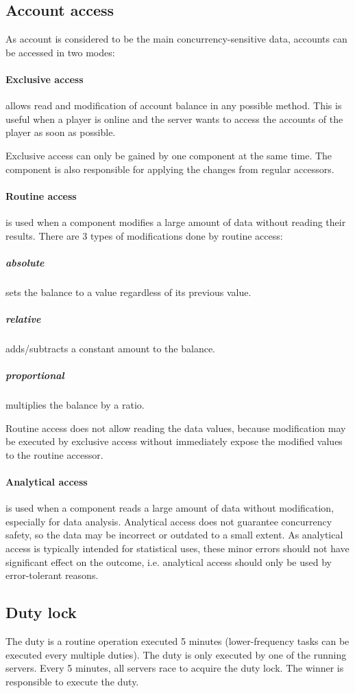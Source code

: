 \documentclass{report}
\begin{document}
				\subsection{Account access}
					As account is considered to be the main concurrency-sensitive data, accounts can be accessed in two modes:
					\paragraph{Exclusive access} allows read and modification of account balance in any possible method.
						This is useful when a player is online and the server wants to access the accounts of the player as soon as possible.

						Exclusive access can only be gained by one component at the same time.
						The component is also responsible for applying the changes from regular accessors.

					\paragraph{Routine access} is used when a component modifies a large amount of data without reading their results.
						There are 3 types of modifications done by routine access:
						\subparagraph{absolute} sets the balance to a value regardless of its previous value.
						\subparagraph{relative} adds/subtracts a constant amount to the balance.
						\subparagraph{proportional} multiplies the balance by a ratio.

						Routine access does not allow reading the data values, because modification may be executed by exclusive access
						without immediately expose the modified values to the routine accessor.

					\paragraph{Analytical access} is used when a component reads a large amount of data without modification, especially for data analysis.
					Analytical access does not guarantee concurrency safety, so the data may be incorrect or outdated to a small extent.
					As analytical access is typically intended for statistical uses, these minor errors should not have significant effect on the outcome,
					i.e. analytical access should only be used by error-tolerant reasons.

				\subsection{Duty lock}
					The duty is a routine operation executed 5 minutes (lower-frequency tasks can be executed every multiple duties).
					The duty is only executed by one of the running servers.
					Every 5 minutes, all servers race to acquire the duty lock.
					The winner is responsible to execute the duty.
\end{document}
